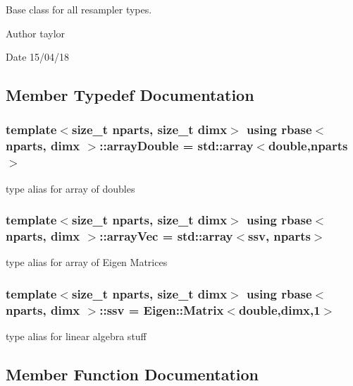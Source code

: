 Base class for all resampler types. 

\begin{DoxyAuthor}{Author}
taylor 
\end{DoxyAuthor}
\begin{DoxyDate}{Date}
15/04/18 
\end{DoxyDate}


\subsection{Member Typedef Documentation}
\subsubsection[{\texorpdfstring{array\+Double}{arrayDouble}}]{\setlength{\rightskip}{0pt plus 5cm}template$<$size\+\_\+t nparts, size\+\_\+t dimx$>$ using {\bf rbase}$<$ nparts, dimx $>$\+::{\bf array\+Double} =  std\+::array$<$double,nparts$>$}\hypertarget{classrbase_ab1b61e00a2e0783d9b414118d912427e}{}\label{classrbase_ab1b61e00a2e0783d9b414118d912427e}
type alias for array of doubles 
\subsubsection[{\texorpdfstring{array\+Vec}{arrayVec}}]{\setlength{\rightskip}{0pt plus 5cm}template$<$size\+\_\+t nparts, size\+\_\+t dimx$>$ using {\bf rbase}$<$ nparts, dimx $>$\+::{\bf array\+Vec} =  std\+::array$<${\bf ssv}, nparts$>$}\hypertarget{classrbase_a428b9f0dd8712a93c096baaf6ab74d8c}{}\label{classrbase_a428b9f0dd8712a93c096baaf6ab74d8c}
type alias for array of Eigen Matrices 
\subsubsection[{\texorpdfstring{ssv}{ssv}}]{\setlength{\rightskip}{0pt plus 5cm}template$<$size\+\_\+t nparts, size\+\_\+t dimx$>$ using {\bf rbase}$<$ nparts, dimx $>$\+::{\bf ssv} =  Eigen\+::\+Matrix$<$double,dimx,1$>$}\hypertarget{classrbase_a78cdecb1ac67ffdaee90be7709c961e4}{}\label{classrbase_a78cdecb1ac67ffdaee90be7709c961e4}
type alias for linear algebra stuff 

\subsection{Member Function Documentation}
